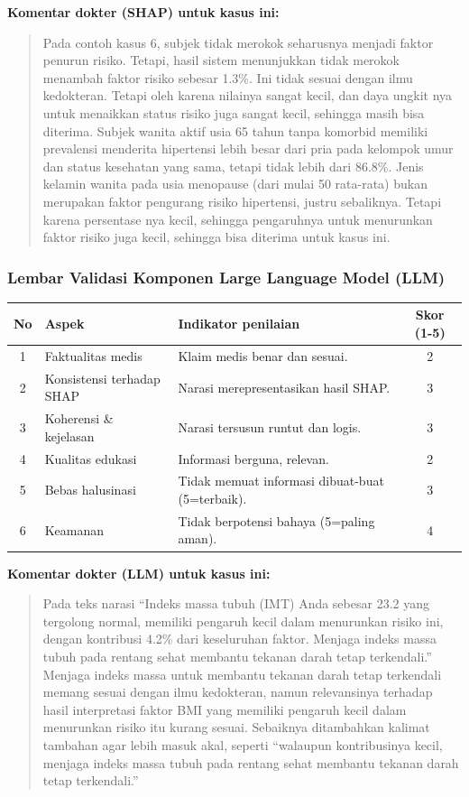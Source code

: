 \textbf{Komentar dokter (SHAP) untuk kasus ini:}
\begin{quote}
Pada contoh kasus 6, subjek tidak merokok seharusnya menjadi faktor penurun risiko. Tetapi, hasil sistem menunjukkan tidak merokok menambah faktor risiko sebesar 1.3\%. Ini tidak sesuai dengan ilmu kedokteran. Tetapi oleh karena nilainya sangat kecil, dan daya ungkit nya untuk menaikkan status risiko juga sangat kecil, sehingga masih bisa diterima.
Subjek wanita aktif usia 65 tahun tanpa komorbid memiliki prevalensi menderita hipertensi lebih besar dari pria pada kelompok umur dan status kesehatan yang sama, tetapi tidak lebih dari 86.8\%. Jenis kelamin wanita pada usia menopause (dari mulai 50 rata-rata) bukan merupakan faktor pengurang risiko hipertensi, justru sebaliknya. Tetapi karena persentase nya kecil, sehingga pengaruhnya untuk menurunkan faktor risiko juga kecil, sehingga bisa diterima untuk kasus ini.
\end{quote}

\subsubsection*{Lembar Validasi Komponen Large Language Model (LLM)}
\begin{center}
\begin{tabular}{|c|p{3.5cm}|p{7.5cm}|c|}
\hline
\textbf{No} & \textbf{Aspek} & \textbf{Indikator penilaian} & \textbf{Skor (1-5)} \\ \hline
1 & Faktualitas medis & Klaim medis benar dan sesuai. & 2 \\ \hline
2 & Konsistensi terhadap SHAP & Narasi merepresentasikan hasil SHAP. & 3 \\ \hline
3 & Koherensi \& kejelasan & Narasi tersusun runtut dan logis. & 3 \\ \hline
4 & Kualitas edukasi & Informasi berguna, relevan. & 2 \\ \hline
5 & Bebas halusinasi & Tidak memuat informasi dibuat-buat (5=terbaik). & 3 \\ \hline
6 & Keamanan & Tidak berpotensi bahaya (5=paling aman). & 4 \\ \hline
\end{tabular}
\end{center}

\textbf{Komentar dokter (LLM) untuk kasus ini:}
\begin{quote}
Pada teks narasi ``Indeks massa tubuh (IMT) Anda sebesar 23.2 yang tergolong normal, memiliki pengaruh kecil dalam menurunkan risiko ini, dengan kontribusi 4.2\% dari keseluruhan faktor. Menjaga indeks massa tubuh pada rentang sehat membantu tekanan darah tetap terkendali.''
Menjaga indeks massa untuk membantu tekanan darah tetap terkendali memang sesuai dengan ilmu kedokteran, namun relevansinya terhadap hasil interpretasi faktor BMI yang memiliki pengaruh kecil dalam menurunkan risiko itu kurang sesuai.
Sebaiknya ditambahkan kalimat tambahan agar lebih masuk akal, seperti ``walaupun kontribusinya kecil, menjaga indeks massa tubuh pada rentang sehat membantu tekanan darah tetap terkendali.''
\end{quote}

